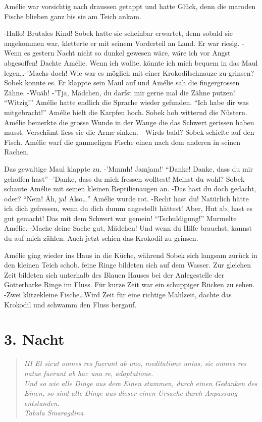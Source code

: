 \documentclass[11pt,titlepage,a5paper]{book}
\begin{document}
Amélie war vorsichtig nach draussen getappt und hatte Glück, denn die maroden Fische blieben ganz bis sie am Teich ankam.

-Hallo! Brutales Kind! Sobek hatte sie scheinbar erwartet, denn sobald sie angekommen war, kletterte er mit seinem Vorderteil an Land. Er war riesig. -Wenn es gestern Nacht nicht so dunkel gewesen wäre, wäre ich vor Angst abgesoffen! Dachte Amélie. Wenn ich wollte, könnte ich mich bequem in das Maul legen\dots -'Machs doch! Wie war es möglich mit einer Krokodilschnauze zu grinsen? Sobek konnte es. Er klappte sein Maul auf und Amélie sah die fingergrossen Zähne. -Wuäh! -'Tja, Mädchen, du darfst mir gerne mal die Zähne putzen! "`Witzig!"' Amélie hatte endlich die Sprache wieder gefunden. "`Ich habe dir was mitgebracht!"' Amélie hielt die Karpfen hoch. Sobek hob witternd die Nüstern. Amélie bemerkte die grosse Wunde in der Wange die das Schwert gerissen haben musst. Verschämt liess sie die Arme sinken. - Wirds bald? Sobek schielte auf den Fisch. Amélie warf die gammeligen Fische einen nach dem anderen in seinen Rachen.

Das gewaltige Maul klappte zu. -'Mmmh! Jamjam!' "`Danke! Danke, dass du mir geholfen hast"' -'Danke, dass du mich fressen wolltest! Meinst du wohl? Sobek schaute Amélie mit seinen kleinen Reptilienaugen an. -Das hast du doch gedacht, oder? "`Nein! Äh, ja! Also\dots"' Amélie wurde rot. -Recht hast du! Natürlich hätte ich dich gefressen, wenn du dich dumm angestellt hättest! Aber, Hut ab, hast es gut gemacht! Das mit dem Schwert war gemein! "`Tschuldigung!"' Murmelte Amélie. -Mache deine Sache gut, Mädchen! Und wenn du Hilfe brauchst, kannst du auf mich zählen. Auch jetzt schien das Krokodil zu grinsen.

Amélie ging wieder ins Haus in die Küche, während Sobek sich langsam zurück in den kleinen Teich schob. feine Ringe bildeten sich auf dem Wasser. Zur gleichen Zeit bildeten sich unterhalb des Blauen Hauses bei der Anlegestelle der Götterbarke Ringe im Fluss. Für kurze Zeit war ein schuppiger Rücken zu sehen. -Zwei klitzekleine Fische\dots Wird Zeit für eine richtige Mahlzeit, dachte das Krokodil und schwamm den Fluss bergauf. 

\chapter*{3. Nacht}


\begin{quotation}

\emph{III Et sicut omnes res fuerunt ab uno, meditatione unius, sic omnes res natae fuerunt ab hac una re, adaptatione.\\Und so wie alle Dinge aus dem Einen stammen, durch einen Gedanken des Einen, so sind alle Dinge aus dieser einen Ursache durch Anpassung entstanden.  \\Tabula Smaragdina}

\end{quotation}
\end{document}
